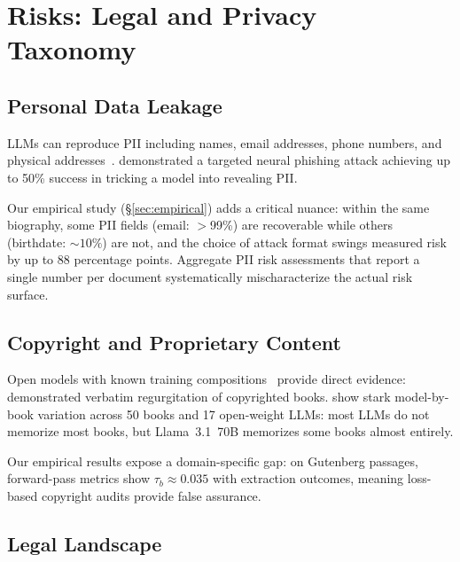 \documentclass[11pt]{article}
\begin{document}
\section{Risks: Legal and Privacy Taxonomy}
\label{app:risks}

\subsection{Personal Data Leakage}

LLMs can reproduce PII including names, email addresses, phone numbers, and
physical
addresses~\citep{carlini2021extractingtrainingdatalarge,li2024llmpbeassessingdataprivacy,jagielski2023measuring,zhou2024quantifying}.
\citet{panda2024teach} demonstrated a targeted neural phishing attack
achieving up to 50\% success in tricking a model into revealing PII\@.

Our empirical study (\S\ref{sec:empirical}) adds a critical nuance: within the
same biography, some PII fields (email: $>$99\%) are recoverable while others
(birthdate: ${\sim}10\%$) are not, and the choice of attack format swings
measured risk by up to 88 percentage points.
Aggregate PII risk assessments that report a single number per document
systematically mischaracterize the actual risk surface.

\subsection{Copyright and Proprietary Content}

Open models with known training
compositions~\citep{gao2020pile,soldaini2024dolma} provide direct evidence:
\citet{henderson2023foundation} demonstrated verbatim regurgitation of
copyrighted books.
\citet{cooper2025extractingmemorizedpiecescopyrighted} show stark model-by-book
variation across 50 books and 17 open-weight LLMs: most LLMs do not memorize
most books, but Llama~3.1~70B memorizes some books almost entirely.

Our empirical results expose a domain-specific gap: on Gutenberg passages,
forward-pass metrics show $\tau_b \approx 0.035$ with extraction outcomes,
meaning loss-based copyright audits provide false assurance.

\subsection{Legal Landscape}
\label{app:legal}
\end{document}
